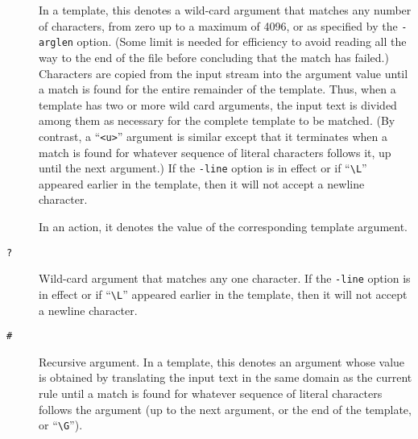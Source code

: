 \begin{description}
\item[{\tt *}]
In a template, this denotes a wild-card argument that matches any number
of characters, from zero up to a maximum of 4096, or as specified by the
\verb/-arglen/ option.  (Some limit is needed for efficiency to avoid
reading all the way to the end of the file before concluding that the match
has failed.)
Characters are copied from the input stream into the argument value
until a match is found for the entire remainder of the template.
Thus, when a template has two or more wild card arguments, the input text is
divided among them as necessary for the complete template to be matched.
(By contrast, a ``\verb/<u>/'' argument is similar except that it
terminates when a match is found for whatever sequence of literal
characters follows it, up until the next argument.)
If the \verb/-line/ option is in effect or if ``\verb/\L/'' appeared
earlier in the template, then it will not accept a newline character.

In an action, it denotes the value of the corresponding
template argument.
\item[{\tt ?}]
Wild-card argument that matches any one character.
If the \verb/-line/ option is in effect or if ``\verb/\L/'' appeared
earlier in the template, then it will not accept a newline character.
\item[{\tt \#}]
Recursive argument.
In a template, this denotes an argument whose value is obtained by
translating the input text in the same domain as the current rule until
a match is found for whatever sequence of literal characters follows the
argument (up to the next argument, or the end of the template, or
``\verb/\G/'').


\end{description}
